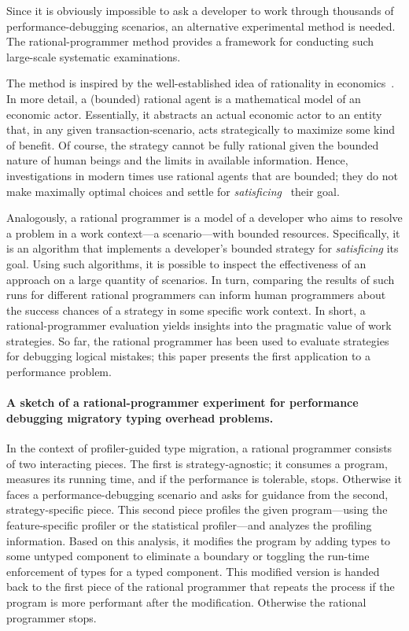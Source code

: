 Since it is obviously impossible to ask a developer to work through thousands of
performance-debugging scenarios, an alternative experimental method is needed.
The rational-programmer method provides a framework for conducting such
large-scale systematic examinations.

The method is inspired by the well-established idea of rationality in
economics~\cite{mill1874essays, henrich2001search}.  In more detail, a (bounded)
rational agent is a mathematical model of an economic actor. Essentially, it
abstracts an actual economic actor to an entity that, in any given
transaction-scenario, acts strategically to maximize some kind of benefit.  Of
course, the strategy cannot be fully rational given the bounded nature of human
beings and the limits in available information. Hence, investigations in modern
times use rational agents that are bounded; they do not make maximally optimal
choices and settle for \emph{satisficing}~\cite{hs:satisfice} their goal.

Analogously, a rational programmer is a model of a developer who aims to resolve
a problem in a work context---a scenario---with bounded
resources. Specifically, it is an algorithm that implements a developer's
bounded strategy for \emph{satisficing} its goal. Using such algorithms, it is
possible to inspect the effectiveness of an approach on a large quantity of
scenarios. In turn, comparing the results of such runs for different rational
programmers can inform human programmers about the success chances of a strategy
in some specific work context. In short, a rational-programmer evaluation yields
insights into the pragmatic value of work strategies. So far, the rational
programmer has been used to evaluate strategies for debugging logical mistakes;
this paper presents the first application to a performance problem. 

\medskip

\paragraph{A sketch of a rational-programmer experiment for performance
debugging migratory typing overhead problems.}  In the context of profiler-guided
type migration, a rational programmer consists of two interacting pieces.  The
first is strategy-agnostic; it consumes a program, measures its running time,
and if the performance is tolerable, stops. Otherwise it faces a
performance-debugging scenario and asks for guidance from the second,
strategy-specific piece. This second piece profiles the given program---using
the feature-specific profiler or the statistical profiler---and analyzes the
profiling information. Based on this analysis, it modifies the program by adding
types to some untyped component to eliminate a boundary or toggling the run-time
enforcement of types for a typed component. This modified version is handed back
to the first piece of the rational programmer that repeats the process if the
program is more performant after the modification.  Otherwise the rational
programmer stops.

